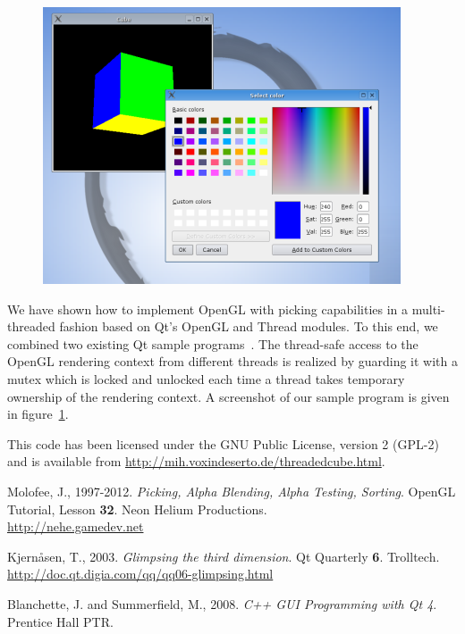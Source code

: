 \documentclass[jou,noapacite]{apa}
\begin{document}
\begin{figure}[bp]
\begin{center}
  \includegraphics[width=.95\linewidth  %
  ]
  {threadedcube_screenshot.png}
  \label{fig:screenshot}
\end{center}
\end{figure}

We have shown how to implement OpenGL with picking capabilities in a multi-threaded fashion
based on Qt's OpenGL and Thread modules.
%
To this end, we combined two existing Qt sample
programs~\cite{glimpse3d,Blanchette2008}.
%
The thread-safe access to the OpenGL rendering context from different threads
is realized by guarding it with a mutex which is locked and unlocked each
time a thread takes temporary ownership of the rendering context.
%
A screenshot of our sample program is given in figure~\ref{fig:screenshot}.
%


This code has been licensed under the GNU Public License, version 2 (GPL-2) and is available
from \url{http://mih.voxindeserto.de/threadedcube.html}.





\begin{thebibliography}{10}


  Molofee, J., 1997-2012. {\itshape Picking, Alpha Blending, Alpha Testing, Sorting}. OpenGL Tutorial, Lesson {\bf 32}. Neon Helium Productions. \\\url{http://nehe.gamedev.net}

Kjern\r{a}sen, T., 2003. {\itshape Glimpsing the third dimension}. Qt Quarterly {\bf 6}. Trolltech.
\url{http://doc.qt.digia.com/qq/qq06-glimpsing.html}

Blanchette, J. and Summerfield, M., 2008. {\itshape C++ GUI Programming with Qt
  4}.   Prentice Hall PTR.
\end{thebibliography}
\end{document}
